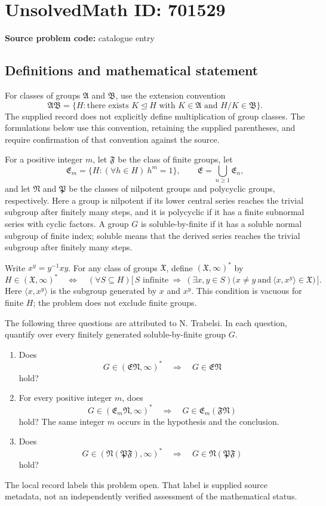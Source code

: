 \documentclass[11pt]{article}
\begin{document}
\section*{UnsolvedMath ID: 701529}
\textbf{Source problem code:} catalogue entry
\subsection{Definitions and mathematical statement}
For classes of groups \(\mathfrak A\) and \(\mathfrak B\), use the extension convention
\[
\mathfrak A\mathfrak B=\{H:\text{there exists }K\trianglelefteq H\text{ with }K\in\mathfrak A\text{ and }H/K\in\mathfrak B\}.
\]
The supplied record does not explicitly define multiplication of group classes. The formulations below use this convention, retaining the supplied parentheses, and require confirmation of that convention against the source.

For a positive integer \(m\), let \(\mathfrak F\) be the class of finite groups, let
\[
\mathfrak E_m=\{H:(\forall h\in H)\ h^m=1\},
\qquad
\mathfrak E=\bigcup_{n\geq 1}\mathfrak E_n,
\]
and let \(\mathfrak N\) and \(\mathfrak P\) be the classes of nilpotent groups and polycyclic groups, respectively. Here a group is nilpotent if its lower central series reaches the trivial subgroup after finitely many steps, and it is polycyclic if it has a finite subnormal series with cyclic factors. A group \(G\) is soluble-by-finite if it has a soluble normal subgroup of finite index; soluble means that the derived series reaches the trivial subgroup after finitely many steps.

Write \(x^y=y^{-1}xy\). For any class of groups \(\mathfrak X\), define \((\mathfrak X,\infty)^\ast\) by
\[
H\in(\mathfrak X,\infty)^\ast
\quad\Longleftrightarrow\quad
(\forall S\subseteq H)\bigl[\,S\text{ infinite}\ \Longrightarrow\ (\exists x,y\in S)\bigl(x\ne y\ \text{and}\ \langle x,x^y\rangle\in\mathfrak X\bigr)\,\bigr].
\]
Here \(\langle x,x^y\rangle\) is the subgroup generated by \(x\) and \(x^y\). This condition is vacuous for finite \(H\); the problem does not exclude finite groups.

The following three questions are attributed to N. Trabelsi. In each question, quantify over every finitely generated soluble-by-finite group \(G\).
\begin{enumerate}
\item[(a)] Does
\[
G\in(\mathfrak E\mathfrak N,\infty)^\ast
\quad\Longrightarrow\quad
G\in\mathfrak E\mathfrak N
\]
hold?
\item[(b)] For every positive integer \(m\), does
\[
G\in(\mathfrak E_m\mathfrak N,\infty)^\ast
\quad\Longrightarrow\quad
G\in\mathfrak E_m(\mathfrak F\mathfrak N)
\]
hold? The same integer \(m\) occurs in the hypothesis and the conclusion.
\item[(c)] Does
\[
G\in(\mathfrak N(\mathfrak P\mathfrak F),\infty)^\ast
\quad\Longrightarrow\quad
G\in\mathfrak N(\mathfrak P\mathfrak F)
\]
hold?
\end{enumerate}
The local record labels this problem open. That label is supplied source metadata, not an independently verified assessment of the mathematical status.
\end{document}
